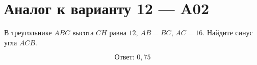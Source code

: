 


\section*{Аналог к варианту 12 — A02}
В треугольнике \(ABC\) высота \(CH\) равна \(12\), \(AB=BC\), \(AC=16\). Найдите синус угла \(ACB\).
\begin{center}\end{center}
\[\boxed{\text{Ответ: }0,75}\]


